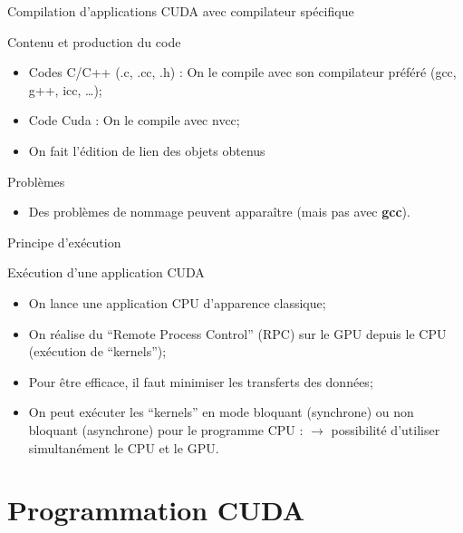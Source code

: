 \documentclass{beamer}
\begin{document}
\begin{frame}{Compilation d'applications CUDA avec compilateur spécifique}

  \begin{exampleblock}{Contenu et production du code}
    \begin{itemize}
    \item Codes  C/C++ (.c, .cc, .h) : On le compile avec son
      compilateur préféré (gcc, g++, icc, \ldots);
    \item Code Cuda : On le compile avec nvcc;
    \item On fait l'édition de lien des objets obtenus
    \end{itemize}
  \end{exampleblock}

  \begin{alertblock}{Problèmes}
    \begin{itemize}
    \item Des problèmes de nommage peuvent apparaître (mais pas avec
      \textbf{gcc}).
    \end{itemize}
  \end{alertblock}
\end{frame}

\begin{frame}{Principe d'exécution}

\begin{exampleblock}{Exécution d'une application CUDA}
\begin{itemize}
\item On lance une application CPU d'apparence classique;
\item On réalise du ``Remote Process Control'' (RPC) sur le GPU depuis le CPU
(exécution de ``kernels'');
\item Pour être efficace, il faut minimiser les transferts des données;
\item On peut exécuter les ``kernels'' en mode bloquant (synchrone) ou 
  non bloquant (asynchrone) pour le programme CPU :
  $\rightarrow$ possibilité d'utiliser simultanément le CPU et le GPU.
\end{itemize}
\end{exampleblock}


\end{frame}
\section{Programmation CUDA}
\end{document}
